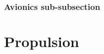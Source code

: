 \documentclass{article}
\begin{document}
    \subsubsection{Avionics sub-subsection}
    \lipsum[10]

    \lipsum[10]
    \lipsum[10]
    \lipsum[10]

    \section{Propulsion}
    \lipsum[10]
    \lipsum[10]
    \lipsum[10]

    \lipsum[10]
    \lipsum[10]
    \lipsum[10]

    \lipsum[10]
    \lipsum[10]
    \lipsum[10]

    \newpage
    \printbibliography
\end{document}
